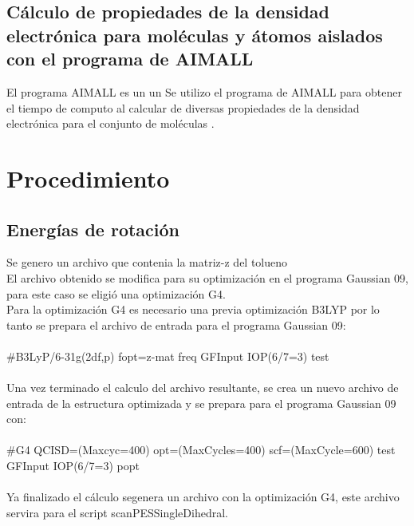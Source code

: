 \documentclass[12pt,letterpaper]{article}
\begin{document}
\subsection{Cálculo de propiedades de la densidad electrónica para moléculas y átomos aislados con el programa de AIMALL}
El programa AIMALL es un un 
Se utilizo el programa de AIMALL para obtener el tiempo de computo al calcular de diversas propiedades de la densidad electrónica para el conjunto de moléculas . 

\section{Procedimiento}
\subsection{Energías de rotación}
Se genero un archivo que contenia la matriz-z del tolueno \\
El archivo obtenido se modifica para su optimización en el programa Gaussian 09, para este caso se eligió una optimización 
G4.\\
Para la optimización G4 es necesario una previa optimización B3LYP por lo tanto se prepara el archivo 
de entrada para el programa Gaussian 09:\\
\\
\#B3LyP/6-31g(2df,p) fopt=z-mat freq GFInput IOP(6/7=3) test\\
\\
Una vez terminado el calculo del archivo resultante, se crea un nuevo archivo de 
entrada de la estructura optimizada y se prepara para el programa Gaussian 09 
con:\\
\\
\#G4 QCISD=(Maxcyc=400) opt=(MaxCycles=400) scf=(MaxCycle=600) test GFInput IOP(6/7=3) popt\\
\\
Ya finalizado el cálculo segenera un archivo con la optimización G4, este archivo servira para el script scanPESSingleDihedral.
\end{document}
